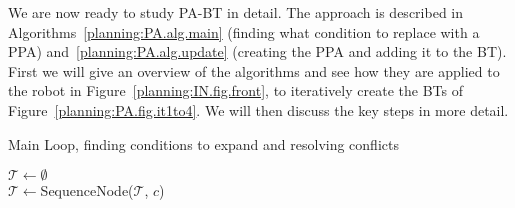 We are now ready to study PA-BT in detail. The approach is described in Algorithms~\ref{planning:PA.alg.main} (finding what condition to replace with a PPA) and~\ref{planning:PA.alg.update} (creating the PPA and adding it to the BT).
First we will give an overview of the algorithms and see how they are applied to the robot in Figure~\ref{planning:IN.fig.front},
to iteratively create the BTs of Figure~\ref{planning:PA.fig.it1to4}.
We will then discuss the key steps in more detail.


\begin{algorithm2e}[h!]
\caption{Main Loop, finding conditions to expand and resolving conflicts} %
 \label{planning:PA.alg.main}
\DontPrintSemicolon
%
 $\mathcal{T} \gets \emptyset$ \\
 {
 $\mathcal{T} \gets $SequenceNode($\mathcal{T}$, $c$)}
 
\end{algorithm2e}

